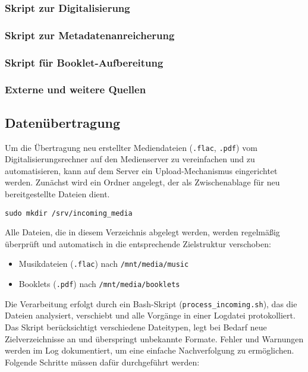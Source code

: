 \documentclass[12pt,a4paper]{report}
\begin{document}
  \subsubsection*{Skript zur Digitalisierung}
  \subsubsection*{Skript zur Metadatenanreicherung}
  \subsubsection*{Skript für Booklet-Aufbereitung}
  \subsubsection*{Externe und weitere Quellen}

  \subsection{Datenübertragung}
  Um die Übertragung neu erstellter Mediendateien (\texttt{.flac}, \texttt{.pdf}) vom Digitalisierungsrechner auf den Medienserver zu vereinfachen 
  und zu automatisieren, kann auf dem Server ein Upload-Mechanismus eingerichtet werden. 
  Zunächst wird ein Ordner angelegt, der als Zwischenablage für neu bereitgestellte Dateien dient. 

  \begin{verbatim}
sudo mkdir /srv/incoming_media
  \end{verbatim}

  Alle Dateien, die in diesem Verzeichnis abgelegt werden, werden regelmäßig überprüft 
  und automatisch in die entsprechende Zielstruktur verschoben:
  \begin{itemize}
    \item Musikdateien (\texttt{.flac}) nach \texttt{/mnt/media/music}
    \item Booklets (\texttt{.pdf}) nach \texttt{/mnt/media/booklets}
  \end{itemize}

  Die Verarbeitung erfolgt durch ein Bash-Skript (\texttt{process\_incoming.sh}), das die Dateien analysiert, 
  verschiebt und alle Vorgänge in einer Logdatei protokolliert. 
  Das Skript berücksichtigt verschiedene Dateitypen, legt bei Bedarf neue Zielverzeichnisse an und überspringt unbekannte Formate. 
  Fehler und Warnungen werden im Log dokumentiert, um eine einfache Nachverfolgung zu ermöglichen.
  Folgende Schritte müssen dafür durchgeführt werden:
\end{document}
